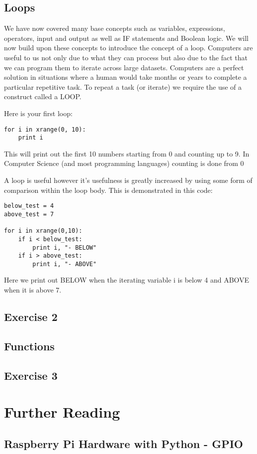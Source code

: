 \documentclass[twocolumn]{article}
\begin{document}
\subsection{Loops}
We have now covered many base concepts such as variables, expressions, operators, input and output as well as IF statements and Boolean logic. We will now build upon these concepts to introduce the concept of a loop. Computers are useful to us not only due to what they can process but also due to the fact that we can program them to iterate across large datasets. Computers are a perfect solution in situations where a human would take months or years to complete a particular repetitive task. To repeat a task (or iterate) we require the use of a construct called a LOOP.

Here is your first loop:
\begin{lstlisting}
for i in xrange(0, 10):
	print i
\end{lstlisting}
This will print out the first 10 numbers starting from 0 and counting up to 9. In Computer Science (and most programming languages) counting is done from 0

A loop is useful however it's usefulness is greatly increased by using some form of comparison within the loop body. This is demonstrated in this code:
\begin{lstlisting}
below_test = 4
above_test = 7

for i in xrange(0,10):
	if i < below_test:
		print i, "- BELOW"
	if i > above_test:
		print i, "- ABOVE"
\end{lstlisting}
Here we print out BELOW when the iterating variable i is below 4 and ABOVE when it is above 7.

\subsection{Exercise 2}

\subsection{Functions}

\subsection{Exercise 3}

\section{Further Reading}

\subsection{Raspberry Pi Hardware with Python - GPIO}
\end{document}
